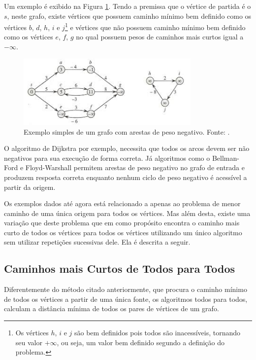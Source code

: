 \documentclass[12pt]{article}
\begin{document}
Um exemplo é exibido na Figura \ref{fig:negativo}. Tendo a premissa que o vértice de partida é o $s$, neste grafo, existe vértices que possuem caminho mínimo bem definido como os vértices $b$, $d$, $h$, $i$ e $j$\footnote{Os vértices $h$, $i$ e $j$ são bem definidos pois todos são inacessíveis, tornando seu valor $+\infty$, ou seja, um valor bem definido segundo a definição do problema.} e vértices que não possuem caminho mínimo bem definido como os vértices $e$, $f$, $g$ no qual possuem pesos de caminhos mais curtos igual a $-\infty$.

\begin{figure}[H]
  \centering
    \includegraphics[width=0.8\textwidth]{img/negativo2.jpeg}
  \caption{Exemplo simples de um grafo com arestas de peso negativo. Fonte: \cite{cormen2002algoritmos}.}
  \label{fig:negativo}
\end{figure}

O algoritmo de Dijkstra por exemplo, necessita que todos os arcos devem ser não negativos para sua execução de forma correta. Já algoritmos como o Bellman-Ford e Floyd-Warshall permitem arestas de peso negativo no grafo de entrada e produzem resposta correta enquanto nenhum ciclo de peso negativo é acessível a partir da origem. 

Os exemplos dados até agora está relacionado a apenas ao problema de menor caminho de uma única origem para todos os vértices. Mas além desta, existe uma variação  que deste problema que em como propósito encontra o caminho mais curto de todos os vértices para todos os vértices utilizando um único algoritmo sem utilizar repetições sucessivas dele. Ela é descrita a seguir.



\subsection{Caminhos mais Curtos de Todos para Todos}

Diferentemente do método citado anteriormente, que procura o caminho mínimo de todos os vértices a partir de uma única fonte, os algoritmos todos para todos, calculam a distância mínima de todos os pares de vértices de um grafo.
\end{document}
